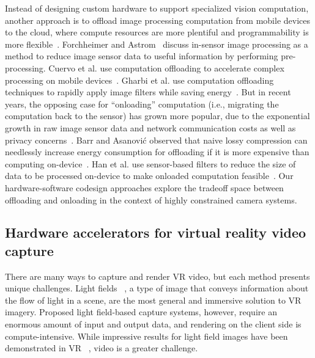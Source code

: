 Instead of designing custom hardware to support specialized vision computation, another approach is to offload image processing computation from mobile devices to the cloud, where compute resources are more plentiful and programmability is more flexible~\cite{pervasive_compute}.
Forchheimer and Astrom~\cite{Forchheimer94} discuss in-sensor image processing as a method to reduce image sensor data to useful information by performing pre-processing.
Cuervo et al. use computation offloading to accelerate complex processing on mobile devices~\cite{cuervo2010maui}.
Gharbi et al. use computation offloading techniques to rapidly apply image filters while saving energy~\cite{transform_recipes}.
But in recent years, the opposing case for ``onloading'' computation (i.e., migrating the computation back to the sensor) has grown more popular, due to the exponential growth in raw image sensor data and network communication costs as well as privacy concerns~\cite{han-hotos, likamwa-apsys}.
Barr and Asanovi\'{c} observed that naive lossy compression can needlessly increase energy consumption for offloading if it is more expensive than computing on-device~\cite{barr_asanovic}.
Han et al. use sensor-based filters to reduce the size of data to be processed on-device to make onloaded computation feasible~\cite{glimpsedata}.
Our hardware-software codesign approaches explore the tradeoff space between offloading and onloading in the context of highly constrained camera systems.

\subsection{Hardware accelerators for virtual reality video capture}
\label{sec:related:vr-hw}

There are many ways to capture and render VR video, but each method presents unique challenges.
Light fields ~\cite{levoy1996light}, a type of image that conveys information about the flow of light in a scene, are the most general and immersive solution to VR imagery.
Proposed light field-based capture systems, however, require an enormous amount of input and output data, and rendering on the client side is compute-intensive.
While impressive results for light field images have been demonstrated in VR ~\cite{Huang2015}, video is a greater challenge.

